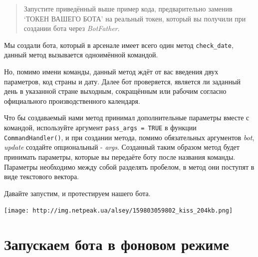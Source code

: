 \documentclass[
]{book}
\newenvironment{Shaded}{\begin{snugshade}}{\end{snugshade}}
\newcommand{\AttributeTok}[1]{\textcolor[rgb]{0.13,0.29,0.53}{#1}}
\newcommand{\CommentTok}[1]{\textcolor[rgb]{0.56,0.35,0.01}{\textit{#1}}}
\newcommand{\ConstantTok}[1]{\textcolor[rgb]{0.56,0.35,0.01}{#1}}
\newcommand{\FunctionTok}[1]{\textcolor[rgb]{0.13,0.29,0.53}{\textbf{#1}}}
\newcommand{\NormalTok}[1]{#1}
\newcommand{\OtherTok}[1]{\textcolor[rgb]{0.56,0.35,0.01}{#1}}
\newcommand{\SpecialCharTok}[1]{\textcolor[rgb]{0.81,0.36,0.00}{\textbf{#1}}}
\newcommand{\StringTok}[1]{\textcolor[rgb]{0.31,0.60,0.02}{#1}}
\begin{document}
\begin{Shaded}
\end{Shaded}

\begin{quote}
Запустите приведённый выше пример кода, предварительно заменив `ТОКЕН ВАШЕГО БОТА' на реальный токен, который вы получили при создании бота через \emph{BotFather}.
\end{quote}

Мы создали бота, который в арсенале имеет всего один метод \texttt{check\_date}, данный метод вызывается одноимённой командой.

Но, помимо имени команды, данный метод ждёт от вас введения двух параметров, код страны и дату. Далее бот проверяется, является ли заданный день в указанной стране выходным, сокращённым или рабочим согласно официального производственного календаря.

Что бы создаваемый нами метод принимал дополнительные параметры вместе с командой, используйте аргумент \texttt{pass\_args\ =\ TRUE} в функции \texttt{CommandHandler()}, и при создании метода, помимо обязательных аргументов \emph{bot}, \emph{update} создайте опциональный - \emph{args}. Созданный таким образом метод будет принимать параметры, которые вы передаёте боту после названия команды. Параметры необходимо между собой разделять пробелом, в метод они поступят в виде текстового вектора.

Давайте запустим, и протестируем нашего бота.

\texttt{[image: http://img.netpeak.ua/alsey/159803059802\_kiss\_204kb.png]}

\section{Запускаем бота в фоновом режиме}\label{ux437ux430ux43fux443ux441ux43aux430ux435ux43c-ux431ux43eux442ux430-ux432-ux444ux43eux43dux43eux432ux43eux43c-ux440ux435ux436ux438ux43cux435}
\end{document}
